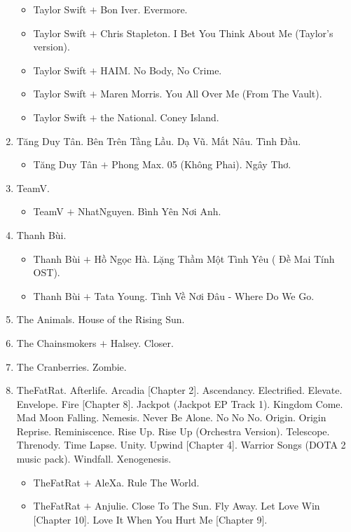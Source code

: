 \documentclass{article}
\begin{document}
\begin{enumerate}
	\begin{itemize}
		\item {\sc Taylor Swift $+$ Bon Iver.} Evermore.
		\item {\sc Taylor Swift $+$ Chris Stapleton.} I Bet You Think About Me (Taylor's version).
		\item {\sc Taylor Swift $+$ HAIM.} No Body, No Crime.
		\item {\sc Taylor Swift $+$ Maren Morris.} You All Over Me (From The Vault).
		\item {\sc Taylor Swift $+$ the National.} Coney Island.
	\end{itemize}
	\item {\sc Tăng Duy Tân.} Bên Trên Tầng Lầu. Dạ Vũ. Mắt Nâu. Tình Đầu.
	\begin{itemize}
		\item {\sc Tăng Duy Tân $+$ Phong Max.} 05 (Không Phai). Ngây Thơ.
	\end{itemize}	
	\item {\sc TeamV.}
	\begin{itemize}
		\item {\sc TeamV $+$ NhatNguyen.} Bình Yên Nơi Anh.
	\end{itemize}
	\item {\sc Thanh Bùi.}
	\begin{itemize}
		\item {\sc Thanh Bùi $+$ Hồ Ngọc Hà.} Lặng Thầm Một Tình Yêu ( Đề Mai Tính OST).
		\item {\sc Thanh Bùi $+$ Tata Young.} Tình Về Nơi Đâu - Where Do We Go.
	\end{itemize}
	\item {\sc The Animals.} House of the Rising Sun.
	\item {\sc The Chainsmokers $+$ Halsey.} Closer.
	\item {\sc The Cranberries.} Zombie.
	\item {\sc TheFatRat.} Afterlife. Arcadia [Chapter 2]. Ascendancy. Electrified. Elevate. Envelope. Fire [Chapter 8]. Jackpot (Jackpot EP Track 1). Kingdom Come. Mad Moon Falling. Nemesis. Never Be Alone. No No No. Origin. Origin Reprise. Reminiscence. Rise Up. Rise Up (Orchestra Version). Telescope. Threnody. Time Lapse. Unity. Upwind [Chapter 4]. Warrior Songs (DOTA 2 music pack). Windfall. Xenogenesis.
	\begin{itemize}
		\item {\sc TheFatRat $+$ AleXa.} Rule The World.
		\item {\sc TheFatRat $+$ Anjulie.} Close To The Sun. Fly Away. Let Love Win [Chapter 10]. Love It When You Hurt Me [Chapter 9].

\end{itemize}
\end{enumerate}
\end{document}
